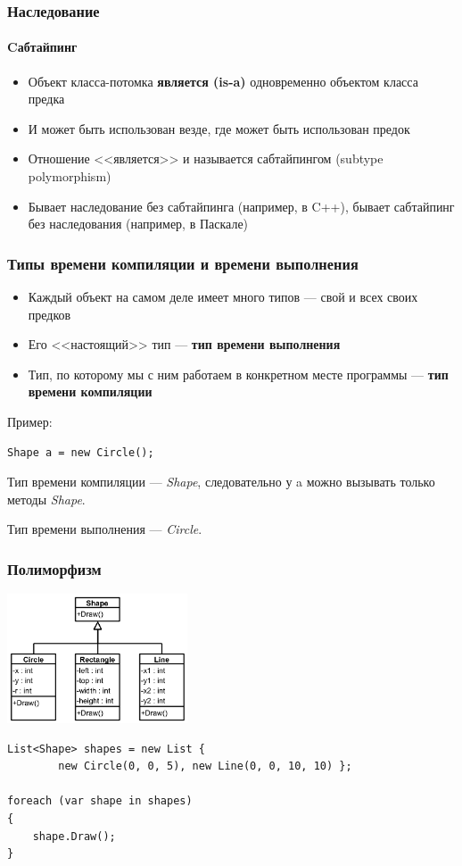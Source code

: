 \documentclass[xetex,mathserif,serif]{beamer}
\begin{document}
    \begin{frame}
        \frametitle{Наследование}
        \framesubtitle{Cабтайпинг}
        \begin{itemize}
            \item Объект класса-потомка \textbf{является (is-a)} одновременно объектом класса предка
            \item И может быть использован везде, где может быть использован предок
            \item Отношение <<является>> и называется сабтайпингом (subtype polymorphism)
            \item Бывает наследование без сабтайпинга (например, в C++), бывает сабтайпинг  без наследования (например, в Паскале)
        \end{itemize}
    \end{frame}

    \begin{frame}[fragile]
        \frametitle{Типы времени компиляции и времени выполнения}
        \begin{itemize}
            \item Каждый объект на самом деле имеет много типов --- свой и всех своих предков
            \item Его <<настоящий>> тип --- \textbf{тип времени выполнения}
            \item Тип, по которому мы с ним работаем в конкретном месте программы --- \textbf{тип времени компиляции}
        \end{itemize}

        Пример:
        \begin{verbatim}
Shape a = new Circle();
        \end{verbatim}
        Тип времени компиляции --- \textit{Shape}, следовательно у a можно вызывать только методы \textit{Shape}. 
        
        Тип времени выполнения --- \textit{Circle}.
    \end{frame}

    \begin{frame}[fragile]
        \frametitle{Полиморфизм}
        \begin{center}
            \includegraphics[width=0.4\textwidth]{polymorphism.png}
        \end{center}

        \begin{verbatim}
List<Shape> shapes = new List { 
        new Circle(0, 0, 5), new Line(0, 0, 10, 10) };

foreach (var shape in shapes) 
{
    shape.Draw();
}
        \end{verbatim}
    \end{frame}
\end{document}
